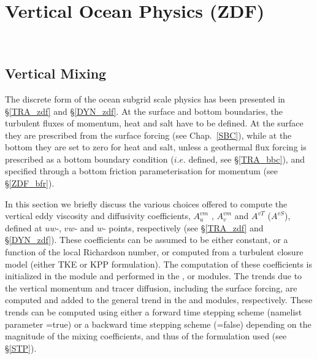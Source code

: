 \chapter{Vertical Ocean Physics (ZDF)}
\label{ZDF}
\minitoc



\newpage
$\ $\newline    %


\section{Vertical Mixing}
\label{ZDF_zdf}

The discrete form of the ocean subgrid scale physics has been presented in 
\S\ref{TRA_zdf} and \S\ref{DYN_zdf}. At the surface and bottom boundaries, 
the turbulent fluxes of momentum, heat and salt have to be defined. At the 
surface they are prescribed from the surface forcing (see Chap.~\ref{SBC}), 
while at the bottom they are set to zero for heat and salt, unless a geothermal 
flux forcing is prescribed as a bottom boundary condition ($i.e.$  
defined, see \S\ref{TRA_bbc}), and specified through a bottom friction 
parameterisation for momentum (see \S\ref{ZDF_bfr}).

In this section we briefly discuss the various choices offered to compute 
the vertical eddy viscosity and diffusivity coefficients, $A_u^{vm}$ , 
$A_v^{vm}$ and $A^{vT}$ ($A^{vS}$), defined at $uw$-, $vw$- and $w$- 
points, respectively (see \S\ref{TRA_zdf} and \S\ref{DYN_zdf}). These 
coefficients can be assumed to be either constant, or a function of the local 
Richardson number, or computed from a turbulent closure model (either 
TKE or KPP formulation). The computation of these coefficients is initialized 
in the  module and performed in the ,  or 
 modules. The trends due to the vertical momentum and tracer 
diffusion, including the surface forcing, are computed and added to the 
general trend in the  and  modules, respectively. 
These trends can be computed using either a forward time stepping scheme 
(namelist parameter =true) or a backward time stepping 
scheme (=false) depending on the magnitude of the mixing 
coefficients, and thus of the formulation used (see \S\ref{STP}).

